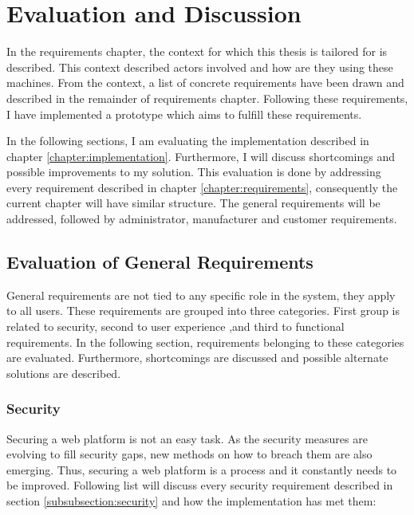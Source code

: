 \chapter{Evaluation and Discussion}
\label{chapter:evaluation}

In the requirements chapter, the context for which this thesis is tailored for is described. This context described actors involved and how are they using these machines. From the context, a list of concrete requirements have been drawn and described in the remainder of requirements chapter. Following these requirements, I have implemented a prototype which aims to fulfill these requirements.

In the following sections, I am evaluating the implementation described in chapter \ref{chapter:implementation}. Furthermore, I will discuss shortcomings and possible improvements to my solution. This evaluation is done by addressing every requirement described in chapter \ref{chapter:requirements}, consequently the current chapter will have similar structure. The general requirements will be addressed, followed by administrator, manufacturer and customer requirements.

\section{Evaluation of General Requirements}

General requirements are not tied to any specific role in the system, they apply to all users. These requirements are grouped into three categories. First group is related to security, second to user experience ,and third to functional requirements. In the following section, requirements belonging to these categories are evaluated. Furthermore, shortcomings are discussed and possible alternate solutions are described.

\subsection{Security}

Securing a web platform is not an easy task. As the security measures are evolving to fill security gaps, new methods on how to breach them are also emerging. Thus, securing a web platform is a process and it constantly needs to be improved. Following list will discuss every security requirement described in section \ref{subsubsection:security} and how the implementation has met them:

